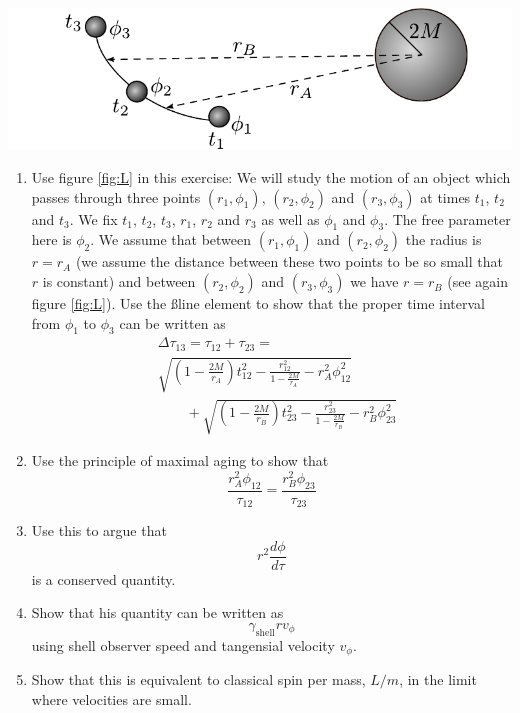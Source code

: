 {\begin{multicols}{2}
\begin{Figure}
\centering
\includegraphics[width=\textwidth]{fig_15-10.pdf}
\end{Figure}

\begin{enumerate}
\item Use figure \ref{fig:L} in this exercise: We will study the motion of an object which passes through three points $(r_1,\phi_1)$, $(r_2,\phi_2)$ and $(r_3,\phi_3)$ at times $t_1$, $t_2$ and $t_3$. We fix $t_1$, $t_2$, $t_3$, $r_1$, $r_2$ and $r_3$ as well as $\phi_1$ and $\phi_3$. The free parameter here is $\phi_{2}$. We assume that between $(r_1,\phi_1)$ and $(r_2,\phi_2)$ the radius is $r=r_A$ (we assume the distance between these two points to be so small that $r$ is constant) and between $(r_2,\phi_2)$ and $(r_3,\phi_3)$ we have $r=r_B$ (see again figure \ref{fig:L}). Use the \ss line element to show that the proper time interval from $\phi_1$ to $\phi_3$ can be written as
\begin{align*}
&\Delta\tau_{13}=\tau_{12}+\tau_{23}=\\
&\sqrt{\left(1-\frac{2M}{r_A}\right)t_{12}^2-\frac{r_{12}^2}{1-\frac{2M}{r_A}}-r_A^2\phi_{12}^2} \\ 
& \qquad +\sqrt{\left(1-\frac{2M}{r_B}\right)t_{23}^2-\frac{r_{23}^2}{1-\frac{2M}{r_B}}-r_B^2\phi_{23}^2}
\end{align*}
\item Use the principle of maximal aging to show that
\[
\frac{r_A^2\phi_{12}}{\tau_{12}}=\frac{r_B^2\phi_{23}}{\tau_{23}}
\]
\item Use this to argue that
\[
r^2\frac{d\phi}{d\tau}
\]
is a conserved quantity.
\item Show that his quantity can be written as
\[
\gamma_\mathrm{shell}rv_\phi
\]
using shell observer speed and tangensial velocity $v_\phi$.
\item Show that this is equivalent to classical spin per mass, $L/m$, in the limit where velocities are small.



\end{enumerate}
\end{multicols}}
